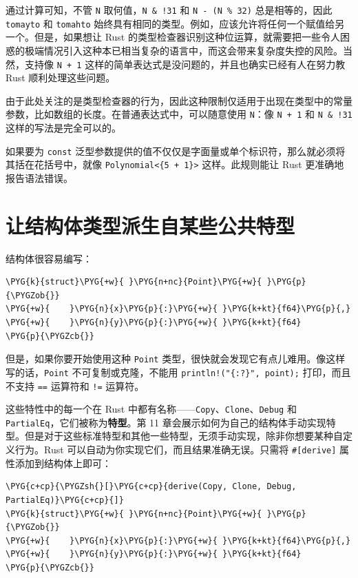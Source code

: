 通过计算可知，不管 \texttt{N} 取何值，\texttt{N \& !31} 和 \texttt{N - (N \% 32)} 总是相等的，因此 \texttt{tomayto} 和 \texttt{tomahto} 始终具有相同的类型。例如，应该允许将任何一个赋值给另一个。但是，如果想让 Rust 的类型检查器识别这种位运算，就需要把一些令人困惑的极端情况引入这种本已相当复杂的语言中，而这会带来复杂度失控的风险。当然，支持像 \texttt{N + 1} 这样的简单表达式是没问题的，并且也确实已经有人在努力教 Rust 顺利处理这些问题。

由于此处关注的是类型检查器的行为，因此这种限制仅适用于出现在类型中的常量参数，比如数组的长度。在普通表达式中，可以随意使用 \texttt{N}：像 \texttt{N + 1} 和 \texttt{N \& !31} 这样的写法是完全可以的。

如果要为 \texttt{const} 泛型参数提供的值不仅仅是字面量或单个标识符，那么就必须将其括在花括号中，就像 \texttt{Polynomial<\{5 + 1\}>} 这样。此规则能让 Rust 更准确地报告语法错误。

\section{让结构体类型派生自某些公共特型}

结构体很容易编写：

\begin{Verbatim}[commandchars=\\\{\},breaklines=true,breakanywhere=true,fontsize=\codefont,xleftmargin=17bp]
\PYG{k}{struct}\PYG{+w}{ }\PYG{n+nc}{Point}\PYG{+w}{ }\PYG{p}{\PYGZob{}}
\PYG{+w}{    }\PYG{n}{x}\PYG{p}{:}\PYG{+w}{ }\PYG{k+kt}{f64}\PYG{p}{,}
\PYG{+w}{    }\PYG{n}{y}\PYG{p}{:}\PYG{+w}{ }\PYG{k+kt}{f64}
\PYG{p}{\PYGZcb{}}
\end{Verbatim}

但是，如果你要开始使用这种 \texttt{Point} 类型，很快就会发现它有点儿难用。像这样写的话，\texttt{Point} 不可复制或克隆，不能用 \texttt{println!("\{:?\}", point);} 打印，而且不支持 \texttt{==} 运算符和 \texttt{!=} 运算符。

这些特性中的每一个在 Rust 中都有名称——\texttt{Copy}、\texttt{Clone}、\texttt{Debug} 和 \texttt{PartialEq}，它们被称为\textbf{特型}。第 11 章会展示如何为自己的结构体手动实现特型。但是对于这些标准特型和其他一些特型，无须手动实现，除非你想要某种自定义行为。Rust 可以自动为你实现它们，而且结果准确无误。只需将 \texttt{\#[derive]} 属性添加到结构体上即可：

\begin{Verbatim}[commandchars=\\\{\},breaklines=true,breakanywhere=true,fontsize=\codefont,xleftmargin=17bp]
\PYG{c+cp}{\PYGZsh{}[}\PYG{c+cp}{derive(Copy, Clone, Debug, PartialEq)}\PYG{c+cp}{]}
\PYG{k}{struct}\PYG{+w}{ }\PYG{n+nc}{Point}\PYG{+w}{ }\PYG{p}{\PYGZob{}}
\PYG{+w}{    }\PYG{n}{x}\PYG{p}{:}\PYG{+w}{ }\PYG{k+kt}{f64}\PYG{p}{,}
\PYG{+w}{    }\PYG{n}{y}\PYG{p}{:}\PYG{+w}{ }\PYG{k+kt}{f64}
\PYG{p}{\PYGZcb{}}
\end{Verbatim}

